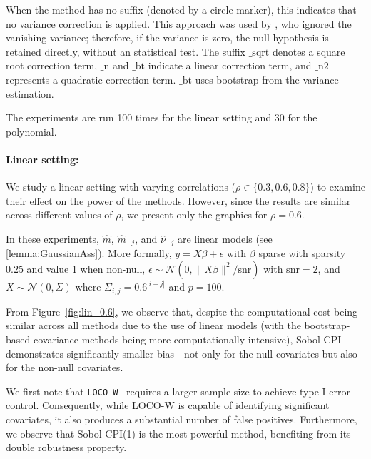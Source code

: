 \documentclass{article}
\theoremstyle{plain}
\theoremstyle{definition}
\theoremstyle{remark}
\begin{document}
When the method has no suffix (denoted by a circle marker), this indicates that no variance correction is applied. This approach was used by \cite{chamma2024statistically}, who ignored the vanishing variance; therefore, if the variance is zero, the null hypothesis is retained directly, without an statistical test. The suffix $\_\mathrm{sqrt}$ denotes a square root correction term, $\_\mathrm{n}$ and $\_\mathrm{bt}$ indicate a linear correction term, and $\_\mathrm{n2}$ represents a quadratic correction term. $\_\mathrm{bt}$ uses bootstrap from the variance estimation.

The experiments are run 100 times for the linear setting and 30 for the polynomial.

\paragraph{Linear setting:} We study a linear setting with varying correlations ($\rho \in \{0.3, 0.6, 0.8\}$) to examine their effect on the power of the methods. However, since the results are similar across different values of $\rho$, we present only the graphics for $\rho = 0.6$.

In these experiments, \( \widehat{m} \), \( \widehat{m}_{-j} \), and \( \widehat{\nu}_{-j} \) are linear models (see \cref{lemma:GaussianAss}).
More formally, $y = X\beta + \epsilon$ with $\beta$ sparse with sparsity $0.25$ and value 1 when non-null, $\epsilon \sim \mathcal{N}(0, \|X\beta\|^2/\mathrm{snr})$ with $\mathrm{snr}=2$, and $X \sim \mathcal{N}(0, \Sigma)$ where $\Sigma_{i,j} = 0.6^{|i-j|}$ and $p = 100$. 



From Figure~\ref{fig:lin_0.6}, we observe that, despite the computational cost being similar across all methods due to the use of linear models (with the bootstrap-based covariance methods being more computationally intensive), Sobol-CPI demonstrates significantly smaller bias—not only for the null covariates but also for the non-null covariates.

We first note that \texttt{LOCO-W}~\citep{williamson2023general} requires a larger sample size to achieve type-I error control. Consequently, while LOCO-W is capable of identifying significant covariates, it also produces a substantial number of false positives. Furthermore, we observe that Sobol-CPI(1) is the most powerful method, benefiting from its double robustness property.


\end{document}
